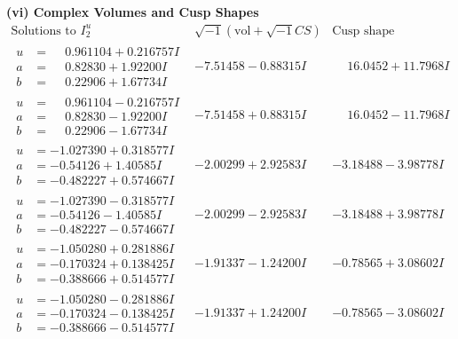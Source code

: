 \documentclass[1p]{elsarticle_modified}
\theoremstyle{definition}
\newcommand{\I}{\sqrt{-1}}
\begin{document}
\newpage\flushleft \textbf{(vi) Complex Volumes and Cusp Shapes}
$$\begin{array}{c|c|c}  
\text{Solutions to }I^u_{2}& \I (\text{vol} + \sqrt{-1}CS) & \text{Cusp shape}\\
 \hline 
\begin{aligned}
u &= \phantom{-}0.961104 + 0.216757 I \\
a &= \phantom{-}0.82830 + 1.92200 I \\
b &= \phantom{-}0.22906 + 1.67734 I\end{aligned}
 & -7.51458 - 0.88315 I & \phantom{-}16.0452 + 11.7968 I \\ \hline\begin{aligned}
u &= \phantom{-}0.961104 - 0.216757 I \\
a &= \phantom{-}0.82830 - 1.92200 I \\
b &= \phantom{-}0.22906 - 1.67734 I\end{aligned}
 & -7.51458 + 0.88315 I & \phantom{-}16.0452 - 11.7968 I \\ \hline\begin{aligned}
u &= -1.027390 + 0.318577 I \\
a &= -0.54126 + 1.40585 I \\
b &= -0.482227 + 0.574667 I\end{aligned}
 & -2.00299 + 2.92583 I & -3.18488 - 3.98778 I \\ \hline\begin{aligned}
u &= -1.027390 - 0.318577 I \\
a &= -0.54126 - 1.40585 I \\
b &= -0.482227 - 0.574667 I\end{aligned}
 & -2.00299 - 2.92583 I & -3.18488 + 3.98778 I \\ \hline\begin{aligned}
u &= -1.050280 + 0.281886 I \\
a &= -0.170324 + 0.138425 I \\
b &= -0.388666 + 0.514577 I\end{aligned}
 & -1.91337 - 1.24200 I & -0.78565 + 3.08602 I \\ \hline\begin{aligned}
u &= -1.050280 - 0.281886 I \\
a &= -0.170324 - 0.138425 I \\
b &= -0.388666 - 0.514577 I\end{aligned}
 & -1.91337 + 1.24200 I & -0.78565 - 3.08602 I \\ \hline\begin{aligned}

\end{aligned}
\end{array}$$
\end{document}
